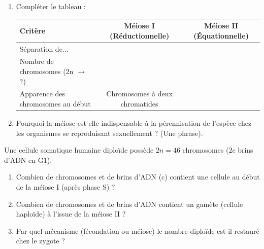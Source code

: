 \documentclass[11pt]{article}
\begin{document}
\begin{exercice}
\begin{enumerate}
\item Compléter le tableau :
\begin{center}
\begin{tabular}{|l|c|c|}
\hline
\textbf{Critère} & \textbf{Méiose I (Réductionnelle)} & \textbf{Méiose II (Équationnelle)} \\
\hline
Séparation de... & & \\
\hline
Nombre de chromosomes (2n $\to$ ?) & & \\
\hline
Apparence des chromosomes au début & Chromosomes à deux chromatides & \\
\hline
\end{tabular}
\end{center}
\item Pourquoi la méiose est-elle indispensable à la pérennisation de l'espèce chez les organismes se reproduisant sexuellement ? (Une phrase).
\end{enumerate}
\end{exercice}

\begin{exercice}
Une cellule somatique humaine diploïde possède $2n = 46$ chromosomes ($2c$ brins d'ADN en G1).
\begin{enumerate}
\item Combien de chromosomes et de brins d'ADN (c) contient une cellule au début de la méiose I (après phase S) ?
\item Combien de chromosomes et de brins d'ADN contient un gamète (cellule haploïde) à l'issue de la méiose II ?
\item Par quel mécanisme (fécondation ou méiose) le nombre diploïde est-il restauré chez le zygote ?
\end{enumerate}
\end{exercice}
\end{document}
